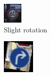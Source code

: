\begin{figure}[H]
    \centering
    \begin{subfigure}{0.32\textwidth}
        \includegraphics[width=\linewidth]{images/figure13/2.png}
        \caption{Slight rotation}
        \label{fig:subfig7}
    \end{subfigure}
    \begin{subfigure}{0.32\textwidth}
        \includegraphics[width=\linewidth]{images/figure13/1.png}

\end{subfigure}
\end{figure}
